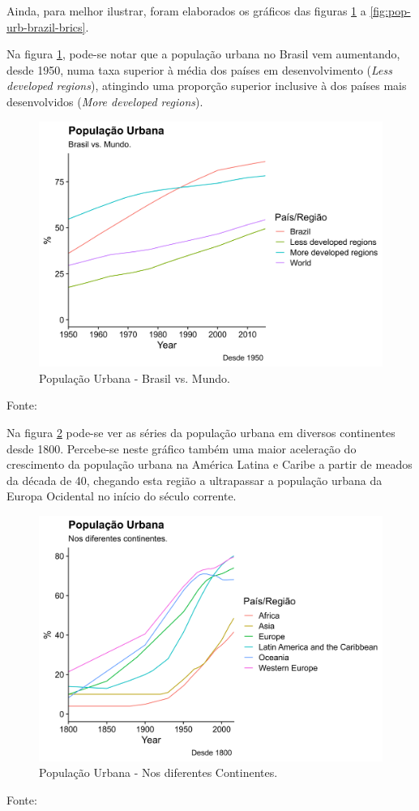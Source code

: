 \documentclass[
	12pt,				%
	oneside,			%
	a4paper,			%
	chapter=TITLE,		%
	section=TITLE,		%
	english,			%
	brazil				%
	]{abntex2}
\newcommand{\bcenter}{\begin{center}}
\newcommand{\ecenter}{\end{center}}
\begin{document}
Ainda, para melhor ilustrar, foram elaborados os gráficos das figuras
\ref{fig:pop-urb-mundo} a \ref{fig:pop-urb-brazil-brics}.

Na figura \ref{fig:pop-urb-mundo}, pode-se notar que a população urbana
no Brasil vem aumentando, desde 1950, numa taxa superior à média dos
países em desenvolvimento (\emph{Less developed regions}), atingindo uma
proporção superior inclusive à dos países mais desenvolvidos (\emph{More
developed regions}).
\begin{figure}[H]

{\centering \includegraphics[width=0.8\linewidth]{images/pop-urb-mundo-1} 

}

\caption{População Urbana - Brasil vs. Mundo.}\label{fig:pop-urb-mundo}
\end{figure}
\bcenter
Fonte: \textcite{doi:10.1177/0959683609356587} \ecenter

Na figura \ref{fig:pop-urb-continents} pode-se ver as séries da
população urbana em diversos continentes desde 1800. Percebe-se neste
gráfico também uma maior aceleração do crescimento da população urbana
na América Latina e Caribe a partir de meados da década de 40, chegando
esta região a ultrapassar a população urbana da Europa Ocidental no
início do século corrente.
\begin{figure}[H]

{\centering \includegraphics[width=0.8\linewidth]{images/pop-urb-continents-1} 

}

\caption{População Urbana - Nos diferentes Continentes.}\label{fig:pop-urb-continents}
\end{figure}
\bcenter
Fonte: \textcite{doi:10.1177/0959683609356587} \ecenter
\end{document}
